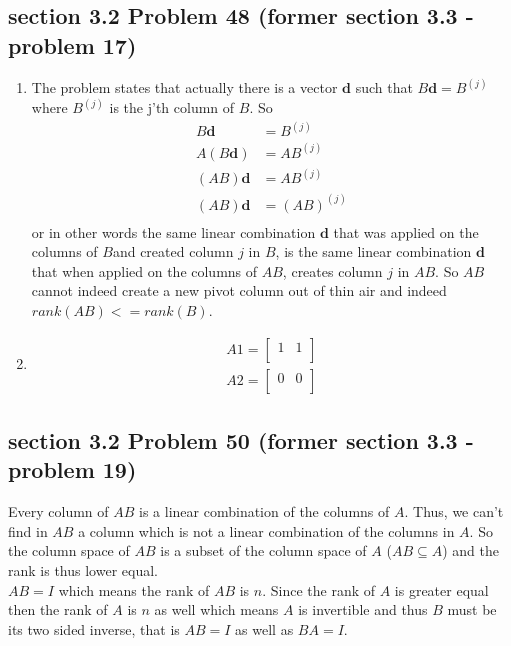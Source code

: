 \documentclass[a4paper,11pt]{article}
\newcommand{\mybf}[1]{\boldsymbol{#1}}
\begin{document}
\subsection*{section 3.2 Problem 48 (former section 3.3 - problem 17)} 
\begin{enumerate}
\item The problem states that actually there is a vector $\mybf{d}$ such that $B\mybf{d}=B^{(j)}$ where $B^{(j)}$ is the j'th column of $B$. So
\begin{align*}
B\mybf{d}&=B^{(j)}\\
A(B\mybf{d})&=AB^{(j)} \\
(AB)\mybf{d}&=AB^{(j)} \\
(AB)\mybf{d}&=(AB)^{(j)} \\
\end{align*}
or in other words the same linear combination $\mybf{d}$ that was applied on the columns of $B$and created column $j$ in $B$,
is the same linear combination $\mybf{d}$ that when applied on the columns of $AB$, creates column $j$ in $AB$.
So $AB$ cannot indeed create a new pivot column out of thin air and indeed $rank(AB)<=rank(B)$.
\item 
\begin{align}
A1 
= 
\begin{bmatrix}
1 & 1 \\
\end{bmatrix}\\
A2 
= 
\begin{bmatrix}
0 & 0 \\
\end{bmatrix}
\end{align}
\end{enumerate}
\subsection*{section 3.2 Problem 50 (former section 3.3 - problem 19)} 
Every column of $AB$ is a linear combination of the columns of $A$. Thus, we can't find in $AB$ a column which is not a linear combination of the columns in $A$. So the column space of $AB$ is a subset of the column space of $A$ ($AB \subseteq A$) and the rank is thus lower equal.\\
$AB=I$ which means the rank of $AB$ is $n$. Since the rank of $A$ is greater equal then the rank of $A$ is $n$ as well which means $A$ is invertible and thus $B$ must be its two sided inverse, that is $AB=I$ as well as $BA=I$.
\end{document}
